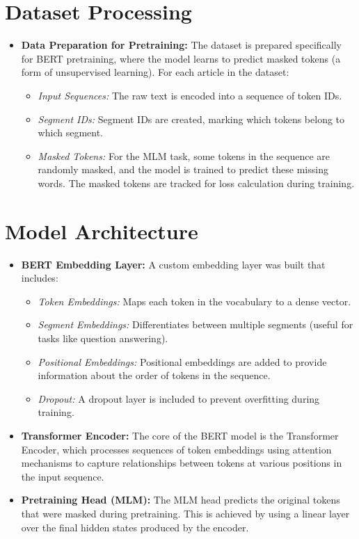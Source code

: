 \section{Dataset Processing}
\begin{itemize}
    \item \textbf{Data Preparation for Pretraining:} The dataset is prepared specifically for BERT pretraining, where the model learns to predict masked tokens (a form of unsupervised learning). For each article in the dataset:
    \begin{itemize}
        \item \textit{Input Sequences:} The raw text is encoded into a sequence of token IDs.
        \item \textit{Segment IDs:} Segment IDs are created, marking which tokens belong to which segment.
        \item \textit{Masked Tokens:} For the MLM task, some tokens in the sequence are randomly masked, and the model is trained to predict these missing words. The masked tokens are tracked for loss calculation during training.
    \end{itemize}
\end{itemize}

\section{Model Architecture}
\begin{itemize}
    \item \textbf{BERT Embedding Layer:} A custom embedding layer was built that includes:
    \begin{itemize}
        \item \textit{Token Embeddings:} Maps each token in the vocabulary to a dense vector.
        \item \textit{Segment Embeddings:} Differentiates between multiple segments (useful for tasks like question answering).
        \item \textit{Positional Embeddings:} Positional embeddings are added to provide information about the order of tokens in the sequence.
        \item \textit{Dropout:} A dropout layer is included to prevent overfitting during training.
    \end{itemize}
    \item \textbf{Transformer Encoder:} The core of the BERT model is the Transformer Encoder, which processes sequences of token embeddings using attention mechanisms to capture relationships between tokens at various positions in the input sequence.
    \item \textbf{Pretraining Head (MLM):} The MLM head predicts the original tokens that were masked during pretraining. This is achieved by using a linear layer over the final hidden states produced by the encoder.
\end{itemize}

